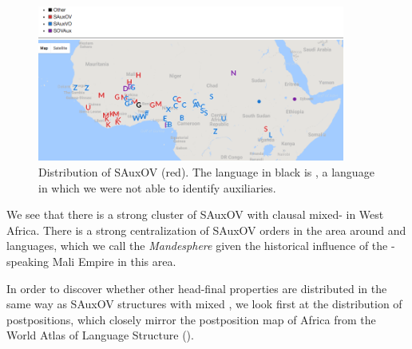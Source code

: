 \documentclass[output=paper,newtxmath,modfonts,nonflat,draftmode]{langsci/langscibook}
\begin{document}
{
  \begin{figure}
    \centering
    \includegraphics[width =0.9\textwidth]{figures/SAOV.png}
    \caption{Distribution of SAuxOV (red). The language in black is , a  language in which we were not able to identify auxiliaries.} \label{fig:sande:sauxov}
  \end{figure}
}


We see that there is a strong cluster of SAuxOV with clausal mixed- in West Africa. There is a strong centralization of SAuxOV orders in the area around  and  languages, which we call the \textit{Mandesphere} given the historical influence of the -speaking Mali Empire in this area.


In order to discover whether other head-final properties are distributed in the same way as SAuxOV structures with mixed , we look first at the distribution of postpositions, which closely mirror the postposition map of Africa from the World Atlas of Language Structure \citep{wals-85} ().
\end{document}
